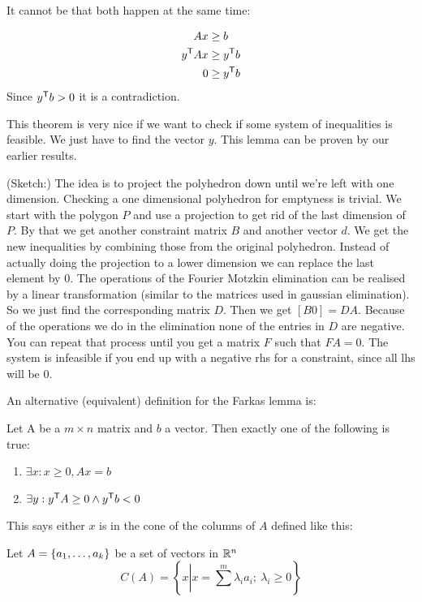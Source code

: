 It cannot be that both happen at the same time:

\begin{align*}
Ax &\geq b\\
{y}^\text{\upshape \sffamily T} Ax&\geq {y}^\text{\upshape \sffamily T} b\\
0 &\geq {y}^\text{\upshape \sffamily T} b
\end{align*}
Since ${y}^\text{\upshape \sffamily T} b>0$ it is a contradiction.

This theorem is very nice if we want to check if some system of inequalities is feasible. We just have to find the vector $y$. This lemma can be proven by our earlier results. 

(Sketch:) The idea is to project the polyhedron down until we're left with one dimension. Checking a one dimensional polyhedron for emptyness is trivial. We start with the polygon $P$ and use a projection to get rid of the last dimension of $P$. By that we get another constraint matrix $B$ and another vector $d$. We get the new inequalities by combining those from the original polyhedron. Instead of actually doing the projection to a lower dimension we can replace the last element by 0. The operations of the Fourier Motzkin elimination can be realised by a linear transformation (similar to the matrices used in gaussian elimination). So we just find the corresponding matrix $D$. Then we get $[B0]=DA$. Because of the operations we do in the elimination none of the entries in $D$ are negative.
You can repeat that process until you get a matrix $F$ such that $FA=0$. The system is infeasible if you end up with a negative rhs for a constraint, since all lhs will be 0.

An alternative (equivalent) definition for the Farkas lemma is:

\begin{thm}\label{Thm:farkasII} Let A be a $m\times n$ matrix and $b$ a vector. Then exactly one of the following is true:
\begin{enumerate}
\item $\exists x: x\geq 0, Ax = b$
\item $\exists y: {y}^\text{\upshape \sffamily T} A \geq 0 \wedge {y}^\text{\upshape \sffamily T} b<0$
\end{enumerate}
\end{thm}

This says either $x$ is in the cone of the columns of $A$ defined like this:

\begin{Def}[Cone] Let $A=\{{a}_1,\ldots,{a}_{k}\}$ be a set of vectors in $\mathbb{R}^n$
\[C(A)=\left\{x\left|x=\sum^m \lambda_i a_i;\ \lambda_i \geq 0\right.\right\}\]
\end{Def}

